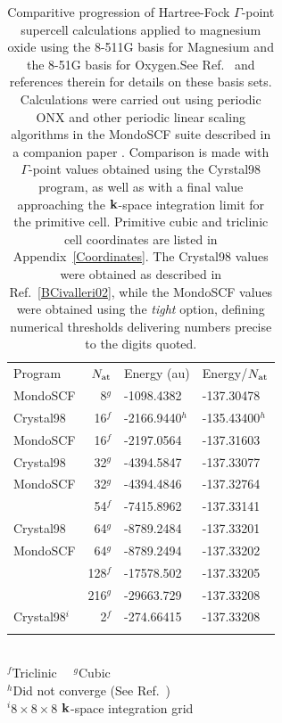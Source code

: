 \documentclass[prb,aps,nobibnotes,twocolumn,doublespace,twocolumngrid,superbib]{revtex4}
\begin{document}
%
%
%
\begin{table}[p]
\caption{Comparitive progression of Hartree-Fock $\Gamma$-point supercell calculations 
applied to magnesium oxide using the 8-511G basis for Magnesium and the 8-51G basis for 
Oxygen.See Ref.~\cite{MTowlerBasis} and references therein for details on these basis sets. 
Calculations were carried out using periodic {\sc ONX} and other periodic linear scaling
algorithms in the {\sc MondoSCF} suite described in a companion paper \cite{CTymczak04a}. 
Comparison is made with $\Gamma$-point values obtained using the {\sc Cyrstal98} program, 
as well as with a final value approaching the $\bf k$-space integration limit for the 
primitive cell.  Primitive cubic and triclinic cell coordinates are listed in 
Appendix~\ref{Coordinates}.  The {\sc Crystal98} values were obtained as 
described in Ref.~\ref{BCivalleri02}, while the {\sc MondoSCF} values were obtained using 
the {\it tight} option, defining numerical thresholds delivering numbers precise to the 
digits quoted.} 
\label{MgOTable}
\begin{tabular}{lrll}
\toprule
Program         & $N_{\rm at}$              & Energy (au)    & Energy/$N_{\rm at}$\\ 
\colrule
{\sc MondoSCF}       & 8$^g$    & -1098.4382     & -137.30478  \\
{\sc Crystal98}      & 16$^f$   & -2166.9440$^h$ & -135.43400$^h$ \\
{\sc MondoSCF}       & 16$^f$   & -2197.0564     & -137.31603  \\
{\sc Crystal98}      & 32$^g$   & -4394.5847     & -137.33077  \\
{\sc MondoSCF}       & 32$^g$   & -4394.4846     & -137.32764  \\
                     & 54$^f$   & -7415.8962     & -137.33141  \\
{\sc Crystal98}      & 64$^g$   & -8789.2484     & -137.33201  \\
{\sc MondoSCF}       & 64$^g$   & -8789.2494     & -137.33202  \\
                     & 128$^f$  & -17578.502     & -137.33205  \\
                     & 216$^g$  & -29663.729     & -137.33208  \\ 
\hline
{\sc Crystal98}$^i$  & 2$^f$    & -274.66415     & -137.33208  \\ 
\botrule 
\end{tabular}\\
$^f$Triclinic~~
$^g$Cubic \\
$^h$Did not converge (See Ref.~\cite{BCivalleri02}) \\
$^i 8\times8\times8$ $\bf k$-space integration grid  \\
\end{table}
\end{document}
